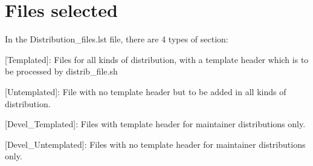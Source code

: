 \section{Files selected}

In the Distribution\_files.lst file, there are 4 types of section:

\begin{description}
\item{[Templated]:} Files for all kinds of distribution, with a template header which is to be processed by distrib\_file.sh
\item{[Untemplated]:} File with no template header but to be added in all kinds of distribution.                         
\item{[Devel\_Templated]:} Files with template header for maintainer distributions only.                                            
\item{[Devel\_Untemplated]:} Files with no template header for maintainer distributions only.       
\end{description}
